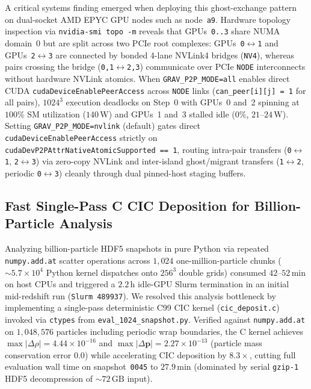 \documentclass[aps,prd,reprint,superscriptaddress,nofootinbib,amsmath,amssymb,floatfix,longbibliography]{revtex4-2}
\begin{document}
A critical systems finding emerged when deploying this ghost-exchange pattern on dual-socket AMD EPYC GPU nodes such as node~\texttt{a9}. Hardware topology inspection via \texttt{nvidia-smi topo -m} reveals that GPUs~\texttt{0..3} share NUMA domain~0 but are split across two PCIe root complexes: GPUs~\texttt{0$\leftrightarrow$1} and GPUs~\texttt{2$\leftrightarrow$3} are connected by bonded 4-lane NVLink4 bridges (\texttt{NV4}), whereas pairs crossing the bridge (\texttt{0,1}$\leftrightarrow$\texttt{2,3}) communicate over PCIe \texttt{NODE} interconnects without hardware NVLink atomics. When \texttt{GRAV\_P2P\_MODE=all} enables direct CUDA \texttt{cudaDeviceEnablePeerAccess} across \texttt{NODE} links (\texttt{can\_peer[i][j] = 1} for all pairs), $1024^3$ execution deadlocks on Step~0 with GPUs~0 and~2 spinning at $100\%$ SM utilization ($140\,\mathrm{W}$) and GPUs~1 and~3 stalled idle ($0\%$, $21\text{--}24\,\mathrm{W}$). Setting \texttt{GRAV\_P2P\_MODE=nvlink} (default) gates direct \texttt{cudaDeviceEnablePeerAccess} strictly on \texttt{cudaDevP2PAttrNativeAtomicSupported == 1}, routing intra-pair transfers (\texttt{0$\leftrightarrow$1}, \texttt{2$\leftrightarrow$3}) via zero-copy NVLink and inter-island ghost/migrant transfers (\texttt{1$\leftrightarrow$2}, periodic \texttt{0$\leftrightarrow$3}) cleanly through dual pinned-host staging buffers.

\subsection{Fast Single-Pass C CIC Deposition for Billion-Particle Analysis}

Analyzing billion-particle HDF5 snapshots in pure Python via repeated \texttt{numpy.add.at} scatter operations across $1{,}024$ one-million-particle chunks ($\sim 5.7 \times 10^4$ Python kernel dispatches onto $256^3$ double grids) consumed $42$--$52\,\mathrm{min}$ on host CPUs and triggered a $2.2\,\mathrm{h}$ idle-GPU Slurm termination in an initial mid-redshift run (\texttt{Slurm 489937}). We resolved this analysis bottleneck by implementing a single-pass deterministic C99 CIC kernel (\texttt{cic\_deposit.c}) invoked via \texttt{ctypes} from \texttt{eval\_1024\_snapshot.py}. Verified against \texttt{numpy.add.at} on $1{,}048{,}576$ particles including periodic wrap boundaries, the C kernel achieves $\max|\Delta \rho| = 4.44 \times 10^{-16}$ and $\max|\Delta \mathbf{p}| = 2.27 \times 10^{-13}$ (particle mass conservation error $0.0$) while accelerating CIC deposition by $8.3\times$, cutting full evaluation wall time on snapshot~\texttt{0045} to $27.9\,\mathrm{min}$ (dominated by serial \texttt{gzip-1} HDF5 decompression of $\sim 72\,\mathrm{GB}$ input).
\end{document}
